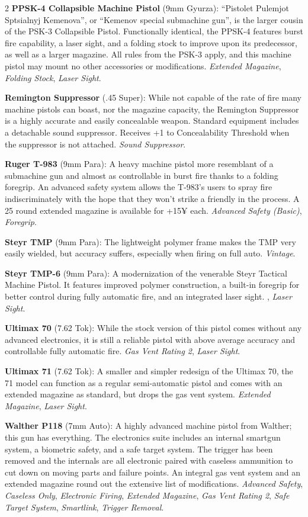 \documentclass[
  oneside]{article}
\begin{document}
\begin{multicols}{2}
\textbf{PPSK-4 Collapsible Machine Pistol} (9mm
Gyurza): ``Pistolet Pulemjot Sptsialnyj
Kemenova'', or ``Kemenov special submachine gun'',
is the larger cousin of the PSK-3 Collapsible
Pistol. Functionally identical, the PPSK-4
features burst fire capability, a laser sight, and
a folding stock to improve upon its predecessor,
as well as a larger magazine. All rules from the
PSK-3 apply, and this machine pistol may mount no
other accessories or modifications. \emph{Extended
Magazine}, \emph{Folding Stock}, \emph{Laser
Sight}.

\textbf{Remington Suppressor} (.45 Super): While
not capable of the rate of fire many machine
pistols can boast, nor the magazine capacity, the
Remington Suppressor is a highly accurate and
easily concealable weapon. Standard equipment
includes a detachable sound suppressor. Receives
+1 to Concealability Threshold when the suppressor
is not attached. \emph{Sound Suppressor}.

\textbf{Ruger T-983} (9mm Para): A heavy machine
pistol more resemblant of a submachine gun and
almost as controllable in burst fire thanks to a
folding foregrip. An advanced safety system allows
the T-983's users to spray fire indiscriminately
with the hope that they won't strike a friendly in
the process. A 25 round extended magazine is
available for +15¥ each. \emph{Advanced Safety
(Basic)}, \emph{Foregrip}.

\textbf{Steyr TMP} (9mm Para): The lightweight
polymer frame makes the TMP very easily wielded,
but accuracy suffers, especially when firing on
full auto. \emph{Vintage}.

\textbf{Steyr TMP-6} (9mm Para): A modernization
of the venerable Steyr Tactical Machine Pistol. It
features improved polymer construction, a built-in
foregrip for better control during fully automatic
fire, and an integrated laser sight. , \emph{Laser
Sight}.

\textbf{Ultimax 70} (7.62 Tok): While the stock
version of this pistol comes without any advanced
electronics, it is still a reliable pistol with
above average accuracy and controllable fully
automatic fire. \emph{Gas Vent Rating 2},
\emph{Laser Sight}.

\textbf{Ultimax 71} (7.62 Tok): A smaller and
simpler redesign of the Ultimax 70, the 71 model
can function as a regular semi-automatic pistol
and comes with an extended magazine as standard,
but drops the gas vent system. \emph{Extended
Magazine}, \emph{Laser Sight}.

\textbf{Walther P118} (7mm Auto): A highly
advanced machine pistol from Walther; this gun has
everything. The electronics suite includes an
internal smartgun system, a biometric safety, and
a safe target system. The trigger has been removed
and the internals are all electronic paired with
caseless ammunition to cut down on moving parts
and failure points. An integral gas vent system
and an extended magazine round out the extensive
list of modifications. \emph{Advanced Safety},
\emph{Caseless Only}, \emph{Electronic Firing},
\emph{Extended Magazine}, \emph{Gas Vent Rating
2}, \emph{Safe Target System}, \emph{Smartlink},
\emph{Trigger Removal}.


\end{multicols}
\end{document}
